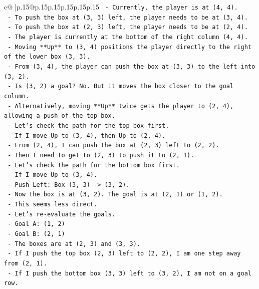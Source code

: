 \documentclass{article}
\begin{document}
{\begin{supertabular}{c@{$\;$}|p{.15\linewidth}@{}p{.15\linewidth}p{.15\linewidth}p{.15\linewidth}p{.15\linewidth}p{.15\linewidth}}
{{{\texttt{    {-} Currently, the player is at (4, 4).} \\
\texttt{    {-} To push the box at (3, 3) left, the player needs to be at (3, 4).} \\
\texttt{    {-} To push the box at (2, 3) left, the player needs to be at (2, 4).} \\
\texttt{    {-} The player is currently at the bottom of the right column (4, 4).} \\
\texttt{    {-} Moving **Up** to (3, 4) positions the player directly to the right of the lower box (3, 3).} \\
\texttt{    {-} From (3, 4), the player can push the box at (3, 3) to the left into (3, 2).} \\
\texttt{    {-} Is (3, 2) a goal? No. But it moves the box closer to the goal column.} \\
\texttt{    {-} Alternatively, moving **Up** twice gets the player to (2, 4), allowing a push of the top box.} \\
\texttt{    {-} Let's check the path for the top box first.} \\
\texttt{        {-} If I move Up to (3, 4), then Up to (2, 4).} \\
\texttt{        {-} From (2, 4), I can push the box at (2, 3) left to (2, 2).} \\
\texttt{        {-} Then I need to get to (2, 3) to push it to (2, 1).} \\
\texttt{    {-} Let's check the path for the bottom box first.} \\
\texttt{        {-} If I move Up to (3, 4).} \\
\texttt{        {-} Push Left: Box (3, 3) {-}> (3, 2).} \\
\texttt{        {-} Now the box is at (3, 2). The goal is at (2, 1) or (1, 2).} \\
\texttt{        {-} This seems less direct.} \\
\texttt{    {-} Let's re{-}evaluate the goals.} \\
\texttt{        {-} Goal A: (1, 2)} \\
\texttt{        {-} Goal B: (2, 1)} \\
\texttt{    {-} The boxes are at (2, 3) and (3, 3).} \\
\texttt{    {-} If I push the top box (2, 3) left to (2, 2), I am one step away from (2, 1).} \\
\texttt{    {-} If I push the bottom box (3, 3) left to (3, 2), I am not on a goal row.} \\
}}}
\end{supertabular}}
\end{document}
